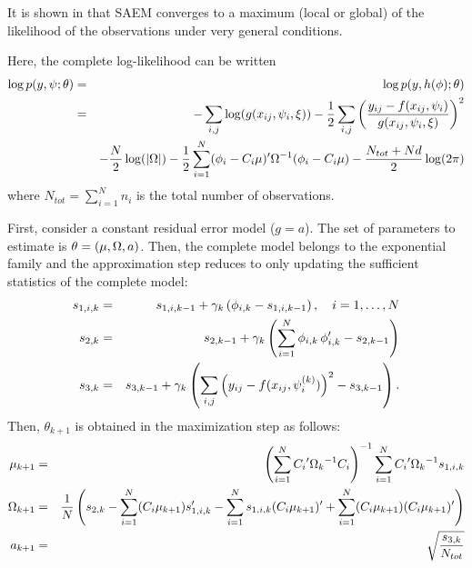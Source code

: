 It is shown in \cite{marc} that
 SAEM converges to a maximum (local or global) of the likelihood of the observations under very general conditions.

Here, the complete log-likelihood can be written
\begin{eqnarray*}
\log p(\yg,\psig;\theta) & = &  \log p(\yg,h(\phig);\theta) \\
&=& - \sum_{i,j}\log( g(x_{ij},\psigi,\xi) )
-\frac{1}{2} \sum_{i,j}\left( \frac{y_{ij} - f(x_{ij},\psigi)}{g(x_{ij},\psigi,\xi) } \right)^2 \\
& & -\frac{N}{2} \log (|\IIV|) -\frac{1}{2}\sum_{i=1}^{N}(\phigi-\magi\fixed_effect)^\prime \IIV^{-1}(\phigi-\magi\fixed_effect)
 -\frac{ N_{tot}+Nd}{2}\log(2\pi)
\end{eqnarray*}
where $N_{tot}=\sum_{i=1}^{N}n_i$ is the total number of observations.

First, consider a constant residual error model ($g=a$). The set of
parameters to estimate is $\theta=(\fixed_effect, \IIV, \ag)$. Then,
the complete model belongs to the exponential family and the
approximation step reduces to only updating the sufficient
statistics of the complete model:
\begin{eqnarray*}
s_{1,i,k} &= & s_{1,i,k-1}  + \gamma_k \left(  {\phi}_{i,k} - s_{1,i,k-1}   \right) , \hspace{1em}i=1,\ldots,N \\
 s_{2,k} &= & s_{2,k-1}  + \gamma_k \left( \sum_{i=1}^{N} {\phi}_{i,k} \, {\phi}_{i,k}^\prime - s_{2,k-1}   \right)  \\
 s_{3,k} &= & s_{3,k-1}  + \gamma_k \left( \sum_{i,j} \left( y_{ij} - f(x_{ij},{\psi_i^{(k)}}) \right) ^2      - s_{3,k-1} \right) .
\end{eqnarray*}
Then, $\theta_{k+1}$ is obtained in the maximization step as follows:
 \begin{eqnarray}
\mugkun &= &\left( \sum_{i=1}^{N}  \magi^\prime \IIVk ^{-1} \magi\right)^{-1} \sum_{i=1}^N \magi^\prime \IIVk ^{-1} s_{1,i,k}  \\
\IIVkun &=& \frac{1}{N} \left(s_{2,k}- \sum_{i=1}^N(\magi\mugkun)s_{1,i,k}^\prime -\sum_{i=1}^N s_{1,i,k}(\magi\mugkun)^\prime +\sum_{i=1}^N (\magi\mugkun)(\magi\mugkun)^\prime\right) \label{react_gamma} \\
\ag_{k+1} & = & \sqrt{ \frac{s_{3,k}}{N_{tot}} }
\end{eqnarray}


